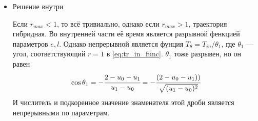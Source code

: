 \documentclass[a4paper, 14pt]{article}
\begin{document}
\begin{enumerate}
\begin{itemize}
			при маленьких $e$ верно, что
			\begin{equation}
				T_{ex}(e,l) = \cfrac{\pi}{2e^{3/2}} - 
				z + \cfrac{z^3}{6}-\cfrac{ez^5}{10} +...+ (-1)^k\cfrac{e^{k}z^{2k+3}}{(4k+6)}
				+...
			\end{equation}
			где
			\begin{equation}
				z = \cfrac{2\sqrt{1-e-l^2}}{1-2e}
			\end{equation}
			
			Замена $r = \cfrac{r_{-}+r_{+}}{2} - \cfrac{r_{+}-r_{-}}{2} \cos{\theta}$ приводит к уравнению:
			\begin{equation*}
				\dot{\theta}\cdot(1 - y\cdot\cos(\theta)) = \cfrac{2\sqrt{e}}{r_{-}+r_{+}} = 2e^{3/2}
			\end{equation*}
				где 
			\begin{equation*}
				y = \cfrac{r_{+}-r_{-}}{r_{-}+r_{+}} = \sqrt{1 - 4el^2}
			\end{equation*}
			тогда 
			\begin{equation*}
				\theta - y \sin{\theta} - (\theta_{-} - y\sin{\theta_{-}}) = 2e^{3/2}(t-t_{-})
			\end{equation*}
			
			если $G(y,z) $ --- обратная функция $\theta \rightarrow \theta - y \sin{\theta}$, тогда
			\begin{equation*}
				\theta = G(y,2e^{3/2}(t-t_{-}) + (\theta_{-} - y\sin{\theta_{-}})) 
			\end{equation*}
			при использовании временного параметра $\tau = t/T_{ex}(e,l)$, получаем
			\begin{equation*}
				\theta = G\left(y,\pi \cdot \left(\tau \cfrac{T_{ex}(e,l)}{T(e)} +
				\cfrac{T_{in}(e,l)}{T(e)}
				\right) \right) 
			\end{equation*}
			где $T_{in}$ --- внутренняя часть времени траектории, $T_{in} + T_{ex} = T(e) = \cfrac{\pi}{2e^{3/2}}$
			\begin{eqnarray*}
				\theta = G(y,\pi (1 -(1 - \tau)z ) ) \\
				z = \cfrac{T_{ex}(e,l)}{T(e)}
			\end{eqnarray*}
			\item Решение внутри
			
			Если $r_{max} < 1$, то всё тривиально, однако если $r_{max} > 1$, траектория гибридная. Во внутренней части её время является разрывной фенкцией параметров $e, l$. 
			Однако непрерывной является фунция $T_{\theta} = T_{in}/\theta_1$, где $\theta_1$ --- угол, соответствующий $r = 1$ в \ref{eq:tr_in_func}. $\theta_1$ тоже разрывен, но он равен
			\begin{equation}
				\cos{\theta_1} = -\cfrac{2-u_0-u_1}{u_1-u_0} = 
				-\cfrac{(2-u_0-u_1))}{\sqrt{(u_1-u_0)^2}} 
			\end{equation}
			И числитель и подкоренное значение знаменателя этой дроби является непрерывными по параметрам.
		\end{itemize}
	\end{enumerate}
	
\end{document}
